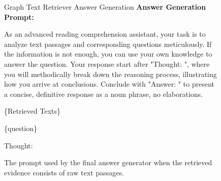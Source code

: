\documentclass[11pt]{article}
\begin{document}
\begin{figure}[t!]
    \small
    \begin{AIbox}{{Graph Text Retriever Answer Generation}}
\textbf{Answer Generation Prompt:}

As an advanced reading comprehension assistant, your task is to analyze text passages and corresponding questions meticulously. If the information is not enough, you can use your own knowledge to answer the question.
Your response start after "Thought: ", where you will methodically break down the reasoning process, illustrating how you arrive at conclusions. 
Conclude with "Answer: " to present a concise, definitive response as a noun phrase, no elaborations.

\{Retrieved Texts\}

\{question\}

Thought:

\end{AIbox}
\caption{The prompt used by the final answer generator when the retrieved evidence consists of raw text passages.}
\label{fig:prompt_ans_gen_text}
\end{figure}
\vspace{-1in}
\end{document}

